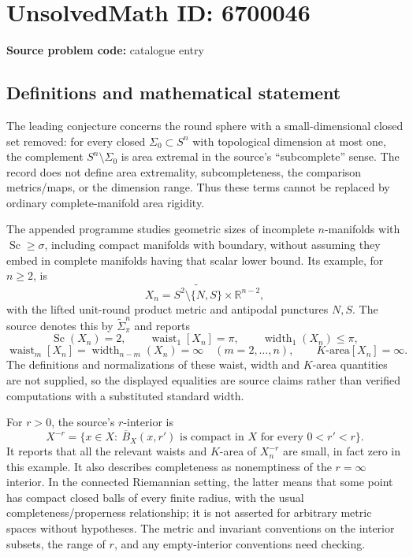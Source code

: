 \documentclass[11pt]{article}
\newcommand{\R}{\mathbb{R}}
\begin{document}
\section*{UnsolvedMath ID: 6700046}
\textbf{Source problem code:} catalogue entry
\subsection{Definitions and mathematical statement}
The leading conjecture concerns the round sphere with a small-dimensional closed set removed: for every closed $\Sigma_0\subset S^n$ with topological dimension at most one, the complement $S^n\setminus\Sigma_0$ is area extremal in the source's ``subcomplete'' sense. The record does not define area extremality, subcompleteness, the comparison metrics/maps, or the dimension range. Thus these terms cannot be replaced by ordinary complete-manifold area rigidity.

The appended programme studies geometric sizes of incomplete $n$-manifolds with $\operatorname{Sc}\geq\sigma$, including compact manifolds with boundary, without assuming they embed in complete manifolds having that scalar lower bound. Its example, for $n\geq2$, is
\[
X_n=\widetilde{S^2\setminus\{N,S\}}\times\R^{n-2},
\]
with the lifted unit-round product metric and antipodal punctures $N,S$. The source denotes this by $\widetilde\Sigma_\pi^n$ and reports
\[
\operatorname{Sc}(X_n)=2,\qquad
\operatorname{waist}_1[X_n]=\pi,\qquad \operatorname{width}_1(X_n)\leq\pi,
\]
\[
\operatorname{waist}_m[X_n]=\operatorname{width}_{n-m}(X_n)=\infty
\quad(m=2,\ldots,n),\qquad K\text{-area}[X_n]=\infty.
\]
The definitions and normalizations of these waist, width and $K$-area quantities are not supplied, so the displayed equalities are source claims rather than verified computations with a substituted standard width.

For $r>0$, the source's $r$-interior is
\[
X^{-r}=\{x\in X:\ \overline B_X(x,r')\text{ is compact in }X
\text{ for every }0<r'<r\}.
\]
It reports that all the relevant waists and $K$-area of $X_n^{-r}$ are small, in fact zero in this example. It also describes completeness as nonemptiness of the $r=\infty$ interior. In the connected Riemannian setting, the latter means that some point has compact closed balls of every finite radius, with the usual completeness/properness relationship; it is not asserted for arbitrary metric spaces without hypotheses. The metric and invariant conventions on the interior subsets, the range of $r$, and any empty-interior conventions need checking.
\end{document}
